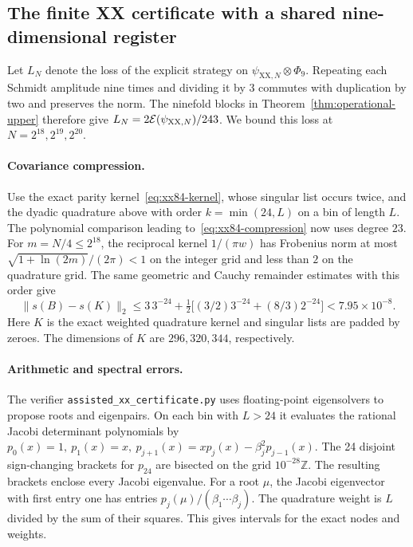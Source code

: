 \subsection{The finite XX certificate with a shared nine-dimensional register}
\label{app:xx-assisted-certificate}

Let \(L_N\) denote the loss of the explicit strategy on
\(\psi_{\mathrm{XX},N}\otimes\Phi_9\). Repeating each Schmidt amplitude nine
times and dividing it by \(3\) commutes with duplication by two and preserves
the norm. The ninefold blocks in Theorem~\ref{thm:operational-upper} therefore
give \(L_N=2\mathcal{E}(\psi_{\mathrm{XX},N})/243\). We bound this loss at
\(N=2^{18},2^{19},2^{20}\).

\paragraph{Covariance compression.}
Use the exact parity kernel~\eqref{eq:xx84-kernel}, whose singular list
occurs twice, and the dyadic quadrature above with order
\(k=\min(24,L)\) on a bin of length \(L\).
The polynomial comparison leading to~\eqref{eq:xx84-compression} now
uses degree \(23\). For \(m=N/4\le2^{18}\), the reciprocal kernel
\(1/(\pi w)\) has Frobenius norm at most
\(\sqrt{1+\ln(2m)}/(2\pi)<1\) on the integer grid and less than \(2\)
on the quadrature grid. The same geometric and Cauchy remainder estimates
with this order give
\[
 \|s(B)-s(K)\|_2
 \le 3\,3^{-24}
      +\tfrac12\bigl[(3/2)3^{-24}+(8/3)2^{-24}\bigr]
 <7.95\times10^{-8}.
\]
Here \(K\) is the exact weighted quadrature kernel and singular lists are
padded by zeroes. The dimensions of \(K\) are \(296,320,344\), respectively.

\paragraph{Arithmetic and spectral errors.}
The verifier \texttt{assisted\_xx\_certificate.py} uses floating-point
eigensolvers to propose roots and eigenpairs. On each bin with \(L>24\)
it evaluates the rational Jacobi determinant polynomials by
\(p_0(x)=1,\ p_1(x)=x,\ p_{j+1}(x)=xp_j(x)-\beta_j^2 p_{j-1}(x)\).
The 24 disjoint sign-changing brackets for \(p_{24}\) are bisected on
the grid \(10^{-28}\mathbb Z\). The resulting brackets enclose every
Jacobi eigenvalue. For a root \(\mu\), the Jacobi eigenvector with first
entry one has entries \(p_j(\mu)/(\beta_1\cdots\beta_j)\). The quadrature
weight is \(L\) divided by the sum of their squares. This gives intervals
for the exact nodes and weights.


